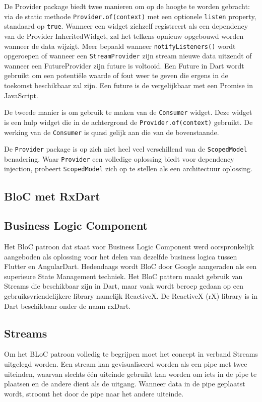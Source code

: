 De Provider package biedt twee manieren om op de hoogte te worden gebracht: via de static methode \verb|Provider.of(context)| met een optionele \verb|listen| property, standaard op \verb|true|.
Wanneer een widget zichzelf registreert als een dependency van de Provider InheritedWidget, zal het telkens opnieuw opgebouwd worden wanneer de data wijzigt. Meer bepaald wanneer \verb|notifyListeners()| wordt opgeroepen of wanneer een \verb|StreamProvider| zijn stream nieuwe data uitzendt of wanneer een FutureProvider zijn future is voltooid. Een Future in Dart wordt gebruikt om een potentiële waarde of fout weer te geven die ergens in de toekomst beschikbaar zal zijn. Een future is de vergelijkbaar met een Promise in JavaScript.

De tweede manier is om gebruik te maken van de \verb|Consumer| widget. Deze widget is een hulp widget die in de achtergrond de \verb|Provider.of(context)| gebruikt. De werking van de \verb|Consumer| is quasi gelijk aan die van de bovenstaande. 

De \verb|Provider| package is op zich niet heel veel verschillend van de \verb|ScopedModel| benadering. Waar \verb|Provider| een volledige oplossing biedt voor dependency injection, probeert \verb|ScopedModel| zich op te stellen als een architectuur oplossing.

\subsection{BloC met RxDart}
\subsection*{Business Logic Component}
Het BloC patroon dat staat voor Business Logic Component werd oorspronkelijk aangeboden als oplossing voor het delen van dezelfde business logica tussen Flutter en AngularDart. Hedendaags wordt BloC door Google aangeraden als een superieure State Management techniek. Het BloC pattern maakt gebruik van Streams die beschikbaar zijn in Dart, maar vaak wordt beroep gedaan op een gebruiksvriendelijkere library namelijk ReactiveX. De ReactiveX (rX) library is in Dart beschikbaar onder de naam rxDart.

\subsection*{Streams}
Om het BLoC patroon volledig te begrijpen moet het concept in verband Streams uitgelegd worden.
Een stream kan gevisualiseerd worden als een pipe met twee uiteinden, waarvan slechts
één uiteinde gebruikt kan worden om iets in de pipe te plaatsen en de andere dient als de uitgang. Wanneer data in de pipe
geplaatst wordt, stroomt het door de pipe naar het andere uiteinde. \autocite{Boelens2018}

